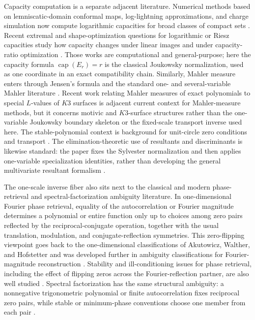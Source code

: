 Capacity computation is a separate adjacent literature.  Numerical
methods based on lemniscatic-domain conformal maps, log-lightning
approximations, and charge simulation now compute logarithmic
capacities for broad classes of compact sets
\citep{LiesenSeteNasser2017,BaddooTrefethen2021,LiesenNasserSete2023}.
Recent extremal and shape-optimization questions for logarithmic or
Riesz capacities study how capacity changes under linear images and
under capacity-ratio optimization \citep{Laugesen2022,ClarkLaugesen2025}.
Those works are computational and general-purpose; here the capacity
formula \(\operatorname{cap}(E_r)=r\) is the classical Joukowsky
normalization, used as one coordinate in an exact compatibility chain.
Similarly, Mahler measure enters through Jensen's formula and the
standard one- and several-variable Mahler literature
\citep{Mahler1962,Smyth1981,Boyd1981,EverestWard1999,BrunaultZudilin2020,McKeeSmyth2021}.
Recent work relating Mahler measures of exact polynomials to
special \(L\)-values of \(K3\) surfaces \citep{Trieu2024K3Mahler}
is adjacent current context for Mahler-measure methods, but it concerns
motivic and \(K3\)-surface structures rather than the one-variable
Joukowsky boundary skeleton or the fixed-scale transport inverse used
here.  The stable-polynomial context is background for unit-circle zero
conditions and transport
\citep{RahmanSchmeisser2002,BorceaBranden2009,LeeYang1952I,LeeYang1952II}.
The elimination-theoretic use of resultants and discriminants is likewise
standard: the paper fixes the Sylvester normalization and then applies
one-variable specialization identities, rather than developing the
general multivariate resultant formalism
\citep{Jouanolou1991,GKZ1994,CoxLittleOShea2005}.

The one-scale inverse fiber also sits next to the classical and modern
phase-retrieval and spectral-factorization ambiguity literature.  In
one-dimensional Fourier phase retrieval, equality of the autocorrelation
or Fourier magnitude determines a polynomial or entire function only up
to choices among zero pairs reflected by the reciprocal-conjugate
operation, together with the usual translation, modulation, and
conjugate-reflection symmetries.  This zero-flipping viewpoint goes back
to the one-dimensional classifications of Akutowicz, Walther, and
Hofstetter and was developed further in ambiguity classifications for
Fourier-magnitude reconstruction
\citep{Akutowicz1956,Walther1963,Hofstetter1964,BruckSodin1979,BeinertPlonka2015,BeinertPlonka2018,Edidin2019}.
Stability and ill-conditioning issues for phase retrieval, including the
effect of flipping zeros across the Fourier-reflection partner, are also
well studied \citep{GrohsKoppensteinerRathmair2020,JamingKellayPerez2022}.
Spectral factorization has the same structural ambiguity: a nonnegative
trigonometric polynomial or finite autocorrelation fixes reciprocal
zero pairs, while stable or minimum-phase conventions choose one member
from each pair \citep{OppenheimSchafer2010}.

